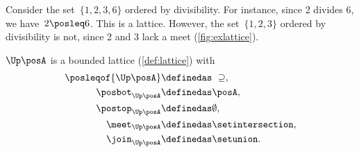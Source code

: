 \begin{example}
	Consider the set~$\{1,2,3,6\}$ ordered by divisibility.
	For instance, since 2 divides 6, we have~$2\posleq 6$.
	This is a lattice.
	However, the set~$\{1,2,3\}$ ordered by divisibility is not, since 2 and 3 lack a meet (\cref{fig:exlattice}).
\end{example}

\begin{lemma}
	\label{lem:u_bounded_lat}
	$\Up \posA$ is a bounded lattice (\cref{def:lattice}) with
	\begin{equation}
		\begin{aligned}
			\posleqof{\Up \posA} & \definedas \ \supseteq, \\
			\posbot_{\Up \posA}  & \definedas \posA,       \\
			\postop_{\Up \posA}  & \definedas \emptyset,   \\
			\meet_{\Up \posA}     & \definedas \setintersection,        \\
			\join_{\Up \posA}   & \definedas \setunion.
		\end{aligned}
	\end{equation}
\end{lemma}
